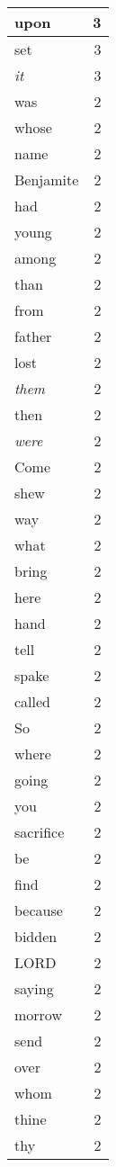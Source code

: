\begin{center}
\begin{longtable}{l|r}
upon & 3 \\ \hline
set & 3 \\ \hline
\emph{it} & 3 \\ \hline
was & 2 \\ \hline
whose & 2 \\ \hline
name & 2 \\ \hline
Benjamite & 2 \\ \hline
had & 2 \\ \hline
young & 2 \\ \hline
among & 2 \\ \hline
than & 2 \\ \hline
from & 2 \\ \hline
father & 2 \\ \hline
lost & 2 \\ \hline
\emph{them} & 2 \\ \hline
then & 2 \\ \hline
\emph{were} & 2 \\ \hline
Come & 2 \\ \hline
shew & 2 \\ \hline
way & 2 \\ \hline
what & 2 \\ \hline
bring & 2 \\ \hline
here & 2 \\ \hline
hand & 2 \\ \hline
tell & 2 \\ \hline
spake & 2 \\ \hline
called & 2 \\ \hline
So & 2 \\ \hline
where & 2 \\ \hline
going & 2 \\ \hline
you & 2 \\ \hline
sacrifice & 2 \\ \hline
be & 2 \\ \hline
find & 2 \\ \hline
because & 2 \\ \hline
bidden & 2 \\ \hline
LORD & 2 \\ \hline
saying & 2 \\ \hline
morrow & 2 \\ \hline
send & 2 \\ \hline
over & 2 \\ \hline
whom & 2 \\ \hline
thine & 2 \\ \hline
thy & 2 \\ \hline

\end{longtable}
\end{center}
